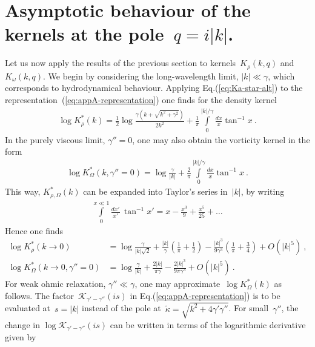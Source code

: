 \documentclass[preprint,aps,eqsecnum, prb]{revtex4-1}
\begin{document}
\section{Asymptotic behaviour of the kernels at the pole~$q = i|k|$.}
\label{sec:appendix-kstar}

Let us now apply the results of the previous section
to kernels~$K_\rho(k, q)$
and~$K_\omega(k, q)$.
We begin by considering the long-wavelength limit, $|k|\ll \gamma$,
which corresponds to hydrodynamical behaviour.
Applying Eq.(\ref{eq:Ka-star-alt}) to
the representation~(\ref{eq:appA-representation})
one finds for the density kernel
\begin{align}
  \log K_\rho^\ast(k)
  =  \frac{1}{2} \log\frac{\gamma(k + \sqrt{k^2 + \gamma^2})}{2 k^2}
  + \frac{1}{\pi}\int\limits_{0}^{|k|/\gamma}
  \frac{dx}{x} \tan^{-1}x
\ .
\end{align}
In the purely viscous limit, $\gamma'' = 0$, one may also
obtain the vorticity kernel in the form
\begin{align}
  \log K_\Omega^\ast(k, \gamma'' = 0) =
   \log\frac{\gamma}{|k|}
  + \frac{2}{\pi}
  \int\limits_{0}^{|k|/\gamma} \frac{dx}{x}\tan^{-1}x
\ .
\end{align}
This way, $K_{\rho,\Omega}^\ast(k)$
can be expanded into Taylor's series in~$|k|$, by writing
\begin{align}
  \int\limits_{0}^{x \ll 1} \frac{dx'}{x'}\, \tan^{-1} x' =
  x - \frac{x^3}{9} + \frac{x^5}{25} + \ldots
\end{align}
Hence one finds
\begin{align}
  \label{eq:krho-k=0}
  \log  K_\rho^\ast(k\to 0) &= \log\frac{\gamma}{|k|\sqrt{2}}
        + \frac{|k|}{\gamma} \left(\frac{1}{\pi} + \frac{1}{2}\right)
        - \frac{|k|^3}{9\gamma^3} \left(\frac{1}{\pi} + \frac{3}{4}\right)
        + O(|k|^5) \ , \\
  \label{eq:komega-k=0}
  \log  K_\Omega^\ast(k \to 0, \gamma'' = 0)
  &= \log\frac{\gamma}{|k|} + \frac{2|k|}{\pi\gamma}
                           - \frac{2|k|^3}{9\pi\gamma^3}
                         +   O(|k|^5)
\ .
\end{align}
For weak ohmic relaxation, $\gamma'' \ll \gamma$,
one may approximate~$\log K_\Omega^\ast(k)$
as follows. The factor~$\mathcal{K}_{\gamma' - \gamma''}(is)$
in Eq.(\ref{eq:appA-representation})
is to be evaluated at~$s = |k|$ instead of the pole
at~$\tilde{\kappa} = \sqrt{k^2 + 4\gamma' \gamma''}$.
For small~$\gamma''$, the change
in $\log \mathcal{K}_{\gamma' - \gamma''}(is)$ can be
written in terms of the logarithmic derivative given by
\end{document}
